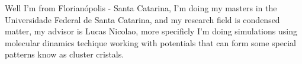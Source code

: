 Well I'm from Florianópolis - Santa Catarina, I'm doing my masters in the Universidade Federal de Santa Catarina, and my research field is condensed matter, my advisor is Lucas Nicolao, more specificly I'm doing simulations using molecular dinamics techique working with potentials that can form some special patterns know as cluster cristals.
